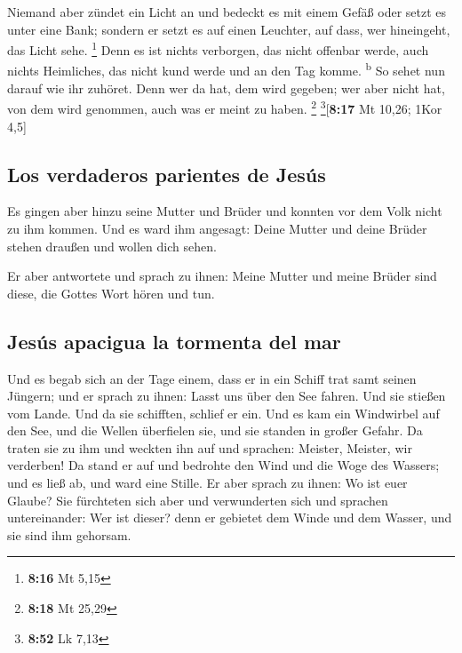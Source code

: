  Niemand aber zündet ein Licht an und bedeckt es mit
einem Gefäß oder setzt es unter eine Bank; sondern er setzt es auf einen
Leuchter, auf dass, wer hineingeht, das Licht sehe. \footnote{\textbf{8:16}
  Mt 5,15}  Denn es ist nichts verborgen, das nicht
offenbar werde, auch nichts Heimliches, das nicht kund werde und an den
Tag komme. \textsuperscript{b}  So sehet nun darauf wie
ihr zuhöret. Denn wer da hat, dem wird gegeben; wer aber nicht hat, von
dem wird genommen, auch was er meint zu haben. \footnote{\textbf{8:18}
  Mt 25,29} \footnote{\textbf{8:52} Lk 7,13}{[}\textbf{8:17} Mt 10,26;
1Kor 4,5{]}

\hypertarget{los-verdaderos-parientes-de-jesuxfas}{%
\subsection{Los verdaderos parientes de
Jesús}\label{los-verdaderos-parientes-de-jesuxfas}}

 Es gingen aber hinzu seine Mutter und Brüder und konnten
vor dem Volk nicht zu ihm kommen.  Und es ward ihm
angesagt: Deine Mutter und deine Brüder stehen draußen und wollen dich
sehen.

 Er aber antwortete und sprach zu ihnen: Meine Mutter und
meine Brüder sind diese, die Gottes Wort hören und tun.

\hypertarget{jesuxfas-apacigua-la-tormenta-del-mar}{%
\subsection{Jesús apacigua la tormenta del
mar}\label{jesuxfas-apacigua-la-tormenta-del-mar}}

 Und es begab sich an der Tage einem, dass er in ein
Schiff trat samt seinen Jüngern; und er sprach zu ihnen: Lasst uns über
den See fahren. Und sie stießen vom Lande.  Und da sie
schifften, schlief er ein. Und es kam ein Windwirbel auf den See, und
die Wellen überfielen sie, und sie standen in großer Gefahr.
 Da traten sie zu ihm und weckten ihn auf und sprachen:
Meister, Meister, wir verderben! Da stand er auf und bedrohte den Wind
und die Woge des Wassers; und es ließ ab, und ward eine Stille.
 Er aber sprach zu ihnen: Wo ist euer Glaube? Sie
fürchteten sich aber und verwunderten sich und sprachen untereinander:
Wer ist dieser? denn er gebietet dem Winde und dem Wasser, und sie sind
ihm gehorsam.

